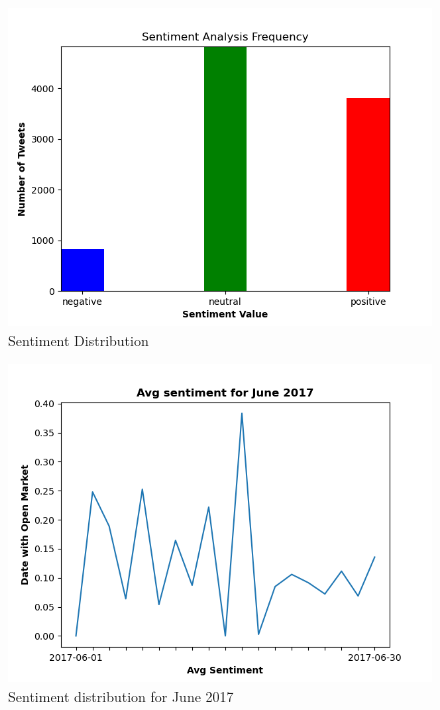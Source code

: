 \documentclass[12pt, notitlepage]{article}
\begin{document}
\begin{figure}[h!]
	\centering
	\includegraphics[scale=0.8]{images/sentiment_distribution.png}
	\caption{Sentiment Distribution}
	\label{fig:SD}
\end{figure}
\begin{figure}[h!]
	\centering
	\includegraphics[scale=0.8]{images/sentiment_overtime.png}
	\caption{Sentiment distribution for June 2017}
	\label{fig:SO}
\end{figure}
\end{document}
